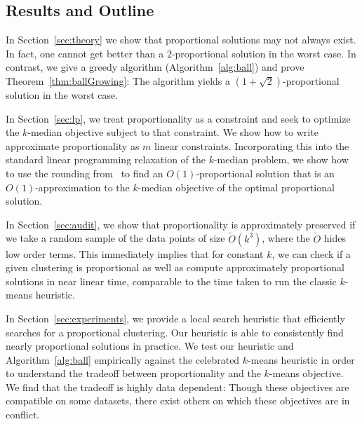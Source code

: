 
\subsection{Results and Outline} 
In Section~\ref{sec:theory} we show that proportional solutions may not always exist. In fact, one cannot get better than a $2$-proportional solution in the worst case. In contrast, we give a greedy algorithm (Algorithm~\ref{alg:ball}) and prove Theorem~\ref{thm:ballGrowing}: The algorithm yields a $\left( 1 + \sqrt{2} \right)$-proportional solution in the worst case. %

In Section~\ref{sec:lp}, we treat proportionality as a constraint and seek to optimize the $k$-median objective subject to that constraint. We show how to write approximate proportionality as $m$ linear constraints. Incorporating this into the standard linear programming relaxation of the $k$-median problem, we show how to use the rounding from~\cite{kMedianLP} to find an $O(1)$-proportional solution that is an $O(1)$-approximation to the $k$-median objective of the optimal proportional solution.

In Section~\ref{sec:audit}, we show that proportionality is approximately preserved if we take a random sample of the data points of size $\tilde{O}(k^3)$, where the $\tilde{O}$ hides low order terms. This immediately implies that for constant $k$, we can check if a given clustering is proportional as well as compute approximately proportional solutions in near linear time, comparable to the time taken to run the classic $k$-means heuristic.

In Section~\ref{sec:experiments}, we provide a local search heuristic that efficiently searches for a proportional clustering. Our heuristic is able to consistently find nearly proportional solutions in practice. We test our heuristic and Algorithm~\ref{alg:ball} empirically against the celebrated $k$-means heuristic in order to understand the tradeoff between proportionality and the $k$-means objective. We find that the tradeoff is highly data dependent: Though these objectives are compatible on some datasets, there exist others on which these objectives are in conflict. %

